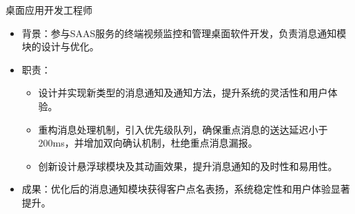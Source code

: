\documentclass{resume}
\begin{document}
 \begin{onehalfspacing}
桌面应用开发工程师
\begin{itemize}
  \item 背景：参与SAAS服务的终端视频监控和管理桌面软件开发，负责消息通知模块的设计与优化。
  \item 职责：
    \begin{itemize}
      \item 设计并实现新类型的消息通知及通知方法，提升系统的灵活性和用户体验。
      \item 重构消息处理机制，引入优先级队列，确保重点消息的送达延迟小于200ms，并增加双向确认机制，杜绝重点消息漏报。
      \item 创新设计悬浮球模块及其动画效果，提升消息通知的及时性和易用性。
    \end{itemize}
  \item 成果：优化后的消息通知模块获得客户点名表扬，系统稳定性和用户体验显著提升。
\end{itemize}
 \end{onehalfspacing}
 

\end{document}

